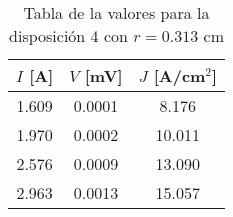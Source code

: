 \begin{table}[h!]
    \centering
\begin{tabular}{ccc}
\toprule
$I$ [A] & $V$ [mV] & $J$ [A/cm$^2$] \\
\midrule
1.609 & 0.0001 & 8.176 \\
1.970 & 0.0002 & 10.011 \\
2.576 & 0.0009 & 13.090 \\
2.963 & 0.0013 & 15.057 \\
\bottomrule
\end{tabular}
    \caption{Tabla de la valores para la disposición 4 con $r=0.313$ cm}
    \label{Tab:VIJ_4}
\end{table}
